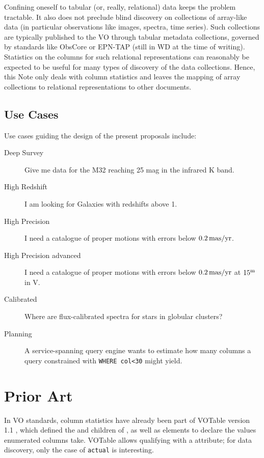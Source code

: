 \documentclass[11pt,a4paper]{ivoa}
\begin{document}
Confining oneself to tabular (or, really, relational) data keeps the
problem tractable.
It also does not preclude blind discovery on
collections of array-like data (in particular observations like images,
spectra, time series).  Such collections are typically published to the
VO through tabular metadata collections, governed by standards like
ObsCore \citep{2017ivoa.spec.0509L} or EPN-TAP (still in WD at the time
of writing).  Statistics on the columns for such
relational representations can reasonably be expected to be useful for
many types of discovery of the data collections.  Hence,
this Note only deals with column statistics and leaves the mapping of
array collections to relational representations to other documents.

\subsection{Use Cases}
\label{sect:uc}

Use cases guiding the design of the present proposals include:

\begin{description}
\item[Deep Survey] Give me data for the M32 reaching 25 mag in the
infrared K band.

\item[High Redshift] I am looking for Galaxies with redshifts above 1.

\item[High Precision] I need a catalogue of proper motions with errors
below $0.2\,\rm mas/yr$.

\item[High Precision advanced] I need a catalogue of proper motions with
errors below $0.2\,\rm mas/yr$ at $15^{\rm m}$ in V.

\item[Calibrated] Where are flux-calibrated spectra for stars in
globular clusters?

\item[Planning] A service-spanning query engine wants to estimate how
many columns a query constrained with \verb|WHERE col<30| might yield.
\end{description}


\section{Prior Art}

In VO standards, column statistics have already been part of
VOTable version 1.1 \citep{2004ivoa.spec.0811O}, which defined the
 and  children of , as well as
 elements to declare the values enumerated columns take.
VOTable allows qualifying  with a  attribute;
for data discovery, only the case of \verb|actual| is interesting.
\end{document}
